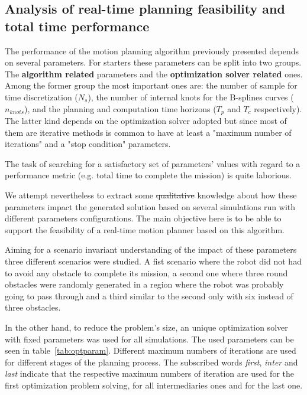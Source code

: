 \subsection{Analysis of real-time planning feasibility and total time performance}

The performance of the motion planning algorithm previously presented depends on several parameters. For starters these parameters can be split into two groups. The \textbf{algorithm related} parameters and the \textbf{optimization solver related} ones. Among the former group the most important ones are: the number of sample for time discretization ($N_s$), the number of internal knots for the B-splines curves ($n_{knots}$), and the planning and computation time horizons ($T_p$ and $T_c$ respectively). The latter kind depends on the optimization solver adopted but since most of them are iterative methods is common to have at least a "maximum number of iterations" and a "stop condition" parameters.

The task of searching for a satisfactory set of parameters' values with regard to a performance metric (e.g. total time to complete the mission) is quite laborious.

We attempt nevertheless to extract some \st{qualitative} knowledge about how these parameters impact the generated solution based on several simulations run with different parameters configurations. The main objective here is to be able to support the feasibility of a real-time motion planner based on this algorithm.

Aiming for a scenario invariant understanding of the impact of these parameters three different scenarios were studied. A fist scenario where the robot did not had to avoid any obstacle to complete its mission, a second one where three round obstacles were randomly generated in a region where the robot was probably going to pass through and a third similar to the second only with six instead of three obstacles.

In the other hand, to reduce the problem's size, an unique optimization solver with fixed parameters was used for all simulations. The used parameters can be seen in table~\ref{tab:optparam}. Different maximum numbers of iterations are used for different stages of the planning process. The subscribed words \textit{first}, \textit{inter} and \textit{last} indicate that the respective maximum numbers of iteration are used for the first optimization problem solving, for all intermediaries ones and for the last one.

